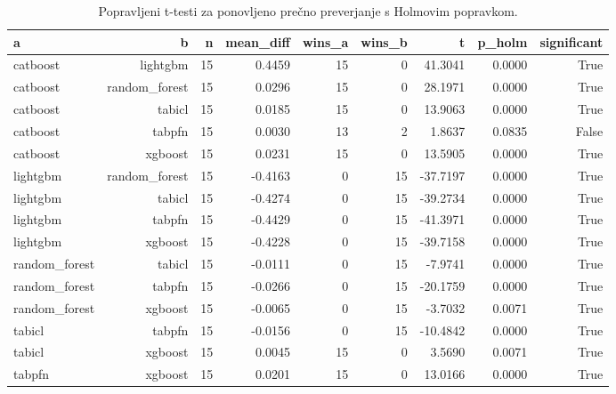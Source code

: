 \begin{table}[htbp]
\centering
\caption{Popravljeni t-testi za ponovljeno prečno preverjanje s Holmovim popravkom.}
\label{tab:corrected-ttest}
\begin{tabular}{lrrrrrrrr}
\hline
a & b & n & mean\_diff & wins\_a & wins\_b & t & p\_holm & significant \\
\hline
catboost & lightgbm & 15 & 0.4459 & 15 & 0 & 41.3041 & 0.0000 & True \\
catboost & random\_forest & 15 & 0.0296 & 15 & 0 & 28.1971 & 0.0000 & True \\
catboost & tabicl & 15 & 0.0185 & 15 & 0 & 13.9063 & 0.0000 & True \\
catboost & tabpfn & 15 & 0.0030 & 13 & 2 & 1.8637 & 0.0835 & False \\
catboost & xgboost & 15 & 0.0231 & 15 & 0 & 13.5905 & 0.0000 & True \\
lightgbm & random\_forest & 15 & -0.4163 & 0 & 15 & -37.7197 & 0.0000 & True \\
lightgbm & tabicl & 15 & -0.4274 & 0 & 15 & -39.2734 & 0.0000 & True \\
lightgbm & tabpfn & 15 & -0.4429 & 0 & 15 & -41.3971 & 0.0000 & True \\
lightgbm & xgboost & 15 & -0.4228 & 0 & 15 & -39.7158 & 0.0000 & True \\
random\_forest & tabicl & 15 & -0.0111 & 0 & 15 & -7.9741 & 0.0000 & True \\
random\_forest & tabpfn & 15 & -0.0266 & 0 & 15 & -20.1759 & 0.0000 & True \\
random\_forest & xgboost & 15 & -0.0065 & 0 & 15 & -3.7032 & 0.0071 & True \\
tabicl & tabpfn & 15 & -0.0156 & 0 & 15 & -10.4842 & 0.0000 & True \\
tabicl & xgboost & 15 & 0.0045 & 15 & 0 & 3.5690 & 0.0071 & True \\
tabpfn & xgboost & 15 & 0.0201 & 15 & 0 & 13.0166 & 0.0000 & True \\
\hline
\end{tabular}
\end{table}
